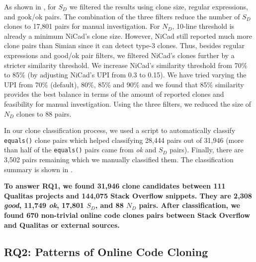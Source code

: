 \documentclass[sigconf,review, anonymous]{acmart}
\begin{document}
As shown in , for $S_D$ we filtered the results using clone size, regular expressions, and gook/ok pairs. The combination of the three filters reduce the number of $S_D$ clones to 17,801 pairs for manual investigation. 
For $N_D$, 10-line threshold is already a minimum NiCad's clone size. However, NiCad still reported much more clone pairs than Simian since it can detect type-3 clones. Thus, besides regular expressions and good/ok pair filters, we filtered NiCad's clones further by a stricter similarity threshold. We increase NiCad's similarity threshold from 70\% to 85\% (by adjusting NiCad's $\mathrm{UPI}$ from 0.3 to 0.15). We have tried varying the UPI from 70\% (default), 80\%, 85\% and 90\% and we found that 85\% similarity provides the best balance in terms of the amount of reported clones and feasibility for manual investigation. Using the three filters, we reduced the size of $N_D$ clones to 88 pairs.

In our clone classification process, we used a script to automatically classify {\small\texttt{equals()}} clone pairs which helped classifying 28,444 pairs out of 31,946 (more than half of the {\small\texttt{equals()}} pairs came from \textit{ok} and $S_D$ pairs). Finally, there are 3,502 pairs remaining which we manually classified them. The classification summary is shown in .

\textbf{To answer RQ1, we found 31,946 clone candidates between 111 Qualitas projects and 144,075 Stack Overflow snippets. They are 2,308 \textit{good}, 11,749 \textit{ok}, 17,801 $S_D$, and 88 $N_D$ pairs. After classification, we found 670 non-trivial online code clones pairs between Stack Overflow and Qualitas or external sources.}

\subsection{RQ2: Patterns of Online Code Cloning}
\end{document}
